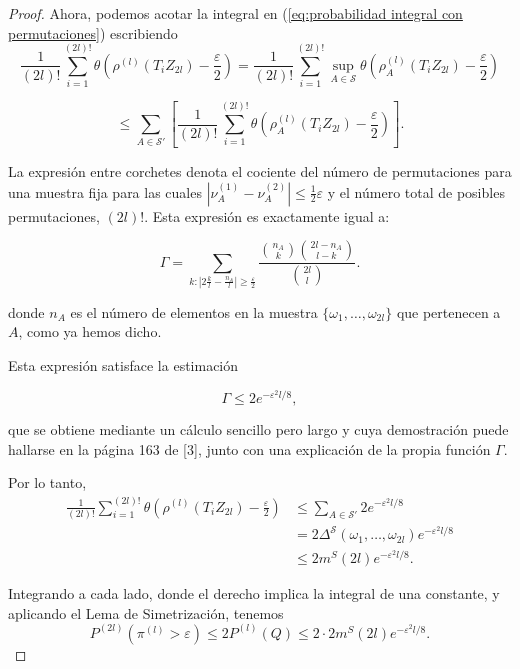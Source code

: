 \documentclass{report}
\begin{document}
\begin{proof}
Ahora, podemos acotar la integral en (\ref{eq:probabilidad integral con permutaciones}) escribiendo
\[
\frac{1}{(2l)!} \sum_{i=1}^{(2l)!} \theta \left(  \rho^{(l)}(T_i Z_{2l}) - \frac{\varepsilon}{2}  \right) 
= \frac{1}{(2l)!} \sum_{i=1}^{(2l)!} \sup_{A \in \mathcal{S}} \theta \left(  \rho^{(l)}_A(T_i Z_{2l}) - \frac{\varepsilon}{2}  \right)
\]

\[
\leq \sum_{A \in \mathcal{S}'} \left[ \frac{1}{(2l)!} \sum_{i=1}^{(2l)!} \theta \left(  \rho^{(l)}_A(T_i Z_{2l}) - \frac{\varepsilon}{2}  \right) \right].
\]

La expresión entre corchetes denota el cociente del número de permutaciones para una muestra fija 
para las cuales \( |\nu^{(1)}_A - \nu^{(2)}_A| \leq \frac{1}{2} \varepsilon \) y el número total de posibles permutaciones, $(2l)!$. Esta expresión
es exactamente igual a:

\[
\Gamma = \sum_{k : |2\frac{k}{l} - \frac{n_A}{l}| \geq \frac{\varepsilon}{2}} \frac{\binom{n_A}{k} \binom{2l - n_A}{l - k}}{\binom{2l}{l}}.
\]

donde \( n_A \) es el número de elementos en la muestra \( \{\omega_1, \dots, \omega_{2l}\} \) que pertenecen a \( A \), como ya hemos dicho. \newline 

Esta expresión satisface la estimación 

\[
\Gamma \leq 2 e^{-\varepsilon^2 l / 8},
\]

que se obtiene mediante un cálculo sencillo pero largo y cuya demostración puede hallarse en la página 163 de [3], junto con una explicación de la propia función $\Gamma$.  \newline

Por lo tanto,
\begin{equation*}
\begin{aligned}
\frac{1}{(2l)!} \sum_{i=1}^{(2l)!} \theta \left(  \rho^{(l)}(T_i Z_{2l}) - \frac{\varepsilon}{2} \right) 
&\leq \sum_{A \in \mathcal{S}'} 2 e^{-\varepsilon^2 l / 8} \\
&= 2 \Delta^{\mathcal{S}}(\omega_1, \dots, \omega_{2l}) e^{-\varepsilon^2 l / 8}\\
&\leq 2 m^S(2l) e^{-\varepsilon^2 l / 8}.
\end{aligned}
\end{equation*}

Integrando a cada lado, donde el derecho implica la integral de una constante, y aplicando el Lema de Simetrización, tenemos
\[
P^{(2l)}\left(\pi^{(l)}>\varepsilon\right) \leq 2 P^{(l)}(Q) \leq 2 \cdot 2 m^S(2l) e^{-\varepsilon^2 l / 8}.
\]

\end{proof}
\end{document}
